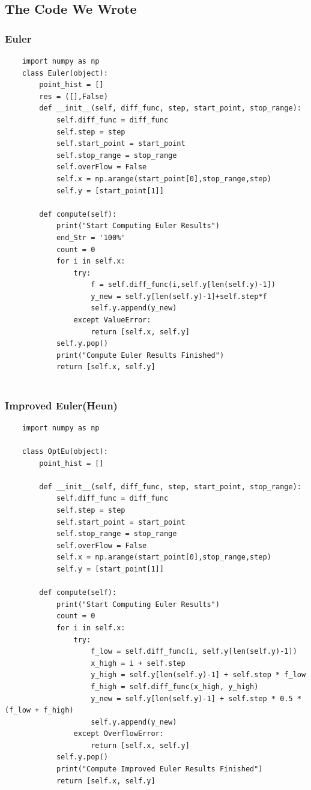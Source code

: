 \documentclass[11pt,a4paper]{article}
\begin{document}
\subsection{The Code We Wrote}

\subsubsection{Euler}
\scriptsize


\begin{lstlisting}
	import numpy as np
	class Euler(object):
		point_hist = []
		res = ([],False)
		def __init__(self, diff_func, step, start_point, stop_range):
			self.diff_func = diff_func
			self.step = step
			self.start_point = start_point
			self.stop_range = stop_range
			self.overFlow = False
			self.x = np.arange(start_point[0],stop_range,step)
			self.y = [start_point[1]]
	
		def compute(self):
			print("Start Computing Euler Results")
			end_Str = '100%'
			count = 0
			for i in self.x:
				try:
					f = self.diff_func(i,self.y[len(self.y)-1])
					y_new = self.y[len(self.y)-1]+self.step*f
					self.y.append(y_new)
				except ValueError:
					return [self.x, self.y]
			self.y.pop()
			print("Compute Euler Results Finished")
			return [self.x, self.y]
		
\end{lstlisting}
\subsubsection{Improved Euler(Heun)}
\begin{lstlisting}
	import numpy as np

	class OptEu(object):
		point_hist = []

		def __init__(self, diff_func, step, start_point, stop_range):
			self.diff_func = diff_func
			self.step = step
			self.start_point = start_point
			self.stop_range = stop_range
			self.overFlow = False
			self.x = np.arange(start_point[0],stop_range,step)
			self.y = [start_point[1]]

		def compute(self):
			print("Start Computing Euler Results")
			count = 0
			for i in self.x:
				try:
					f_low = self.diff_func(i, self.y[len(self.y)-1])
					x_high = i + self.step
					y_high = self.y[len(self.y)-1] + self.step * f_low
					f_high = self.diff_func(x_high, y_high)
					y_new = self.y[len(self.y)-1] + self.step * 0.5 * (f_low + f_high)
					self.y.append(y_new)
				except OverflowError:
					return [self.x, self.y]
			self.y.pop()
			print("Compute Improved Euler Results Finished")
			return [self.x, self.y]
\end{lstlisting}
\end{document}
